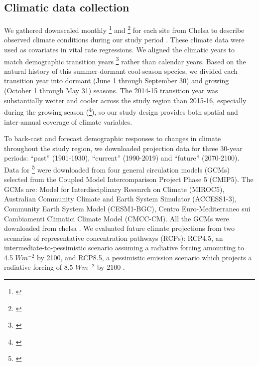 \documentclass[12pt]{article}
\newcommand{\tom}[2]{{\color{red}{#1}}\footnote{\textit{\color{red}{#2}}}}
\begin{document}
\subsection*{Climatic data collection}
We gathered downscaled monthly \tom{temperature}{Give units} and \tom{precipitation}{Give units} for each site from Chelsa to describe observed climate conditions during our study period \citep{karger2017climatologies}.
These climate data were used as covariates in vital rate regressions. 
We aligned the climatic years to match demographic transition years \tom{{\color{blue}(May 1 -- April 30)}}{I think this is not right. I think we updated the transition year to be June 1 -- May 31.} rather than calendar years.
Based on the natural history of this summer-dormant cool-season species, we divided each transition year into dormant (June 1 through September 30) and growing (October 1 through May 31) seasons. 
The 2014-15 transition year was substantially wetter and cooler across the study region than 2015-16, especially during the growing season (\tom{figure}{I would like to use the figure I made called site-year-weather. However, I cannot tell from this figure whether the first year was unusually wet or the second year was unusually dry -- this will take looking at the climate data more broadly. I am also not sure if this figure was made before or after we changed the dates of the transition year, so it may need to be updated}), so our study design provides both spatial and inter-annual coverage of climate variables. 

To back-cast and forecast demographic responses to changes in climate throughout the study region, we downloaded projection data for three 30-year periods: ``past'' (1901-1930), ``current'' (1990-2019) and ``future'' (2070-2100).
Data for \tom{these climatic periods}{The four GCMs only refers to the future data, right?} were downloaded from four general circulation models (GCMs) selected from the Coupled Model Intercomparison Project Phase 5 (CMIP5). 
The GCMs are: Model for Interdisciplinary Research on Climate (MIROC5), Australian Community Climate and Earth System Simulator (ACCESS1-3), Community Earth System Model (CESM1-BGC), Centro Euro-Mediterraneo sui Cambiamenti Climatici Climate Model (CMCC-CM).
All the GCMs were downloaded from chelsa \citep{sanderson2015representative}.
We evaluated future climate projections from two scenarios of representative concentration pathways (RCPs): RCP4.5, an intermediate-to-pessimistic scenario assuming a radiative forcing amounting to 4.5 $W m^{-2}$ by 2100, and RCP8.5, a pessimistic emission scenario which projects a radiative forcing of 8.5 $W m^{-2}$ by 2100 \citep{thomson2011rcp4, schwalm2020rcp8}. 
\end{document}
